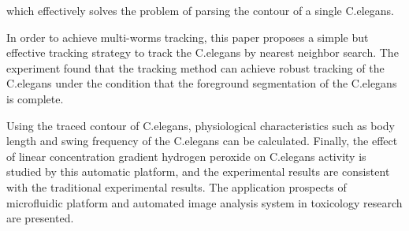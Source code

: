 \begin{englishabstract}
\begin{enumerate*}[label=\itshape\alph*)\upshape]
	which effectively solves the problem of parsing the contour of a single C.elegans.\quad
	\item In order to achieve multi-worms tracking, this paper proposes a simple but effective 
	tracking strategy to track the C.elegans by nearest neighbor search.
 The experiment found that the tracking method can achieve robust
 tracking of the C.elegans under the condition that 
 the foreground segmentation of the C.elegans is complete.\quad
\end{enumerate*}
 Using the traced contour of C.elegans, physiological characteristics such as 
 body length and swing frequency of the C.elegans can be calculated.
Finally, the effect of linear concentration gradient hydrogen peroxide on C.elegans activity 
is studied by this automatic platform, and the experimental results 
are consistent with the traditional experimental results. 
The application prospects
 of microfluidic platform and automated image analysis system in toxicology research are presented.
 
\end{englishabstract}

